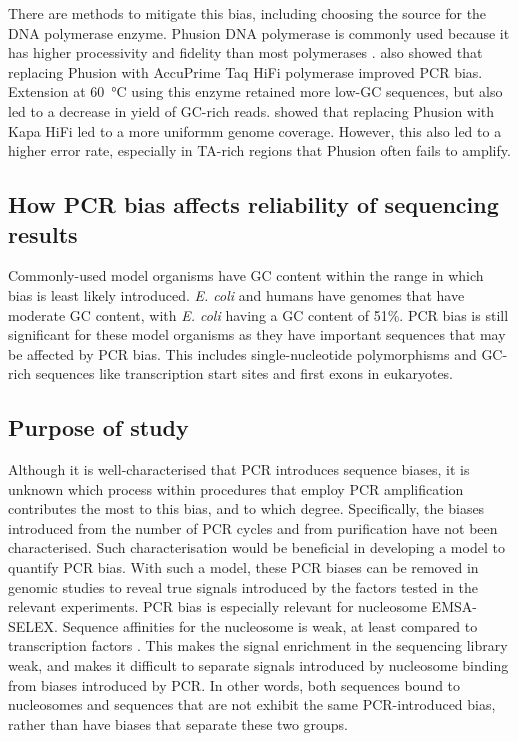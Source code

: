 \documentclass[parskip=full, numbers=noenddot]{scrbook}
\begin{document}
There are methods to mitigate this bias, including choosing the source for the DNA polymerase enzyme.  Phusion DNA polymerase is commonly used because it has higher processivity and fidelity than most polymerases \citep{quail_optimal_2012}.  \citet{aird_analyzing_2011} also showed that replacing Phusion with AccuPrime Taq HiFi polymerase improved PCR bias.  Extension at \SI{60}{\celsius} using this enzyme retained more low-GC sequences, but also led to a decrease in yield of GC-rich reads.  \citet{quail_optimal_2012} showed that replacing Phusion with Kapa HiFi led to a more uniformm genome coverage.  However, this also led to a higher error rate, especially in TA-rich regions that Phusion often fails to amplify.

\subsection{How PCR bias affects reliability of sequencing results}
\label{ssec:pcrbias_intro_effects}

Commonly-used model organisms have GC content within the range in which bias is least likely introduced.  \emph{E. coli} and humans have genomes that have moderate GC content, with \emph{E. coli} having a GC content of 51\%.  PCR bias is still significant for these model organisms as they have important sequences that may be affected by PCR bias.  This includes single-nucleotide polymorphisms and GC-rich sequences like transcription start sites and first exons in eukaryotes.  %

\subsection{Purpose of study}
\label{ssec:pcrbias_intro_why}

Although it is well-characterised that PCR introduces sequence biases, it is unknown which process within procedures that employ PCR amplification contributes the most to this bias, and to which degree.  Specifically, the biases introduced from the number of PCR cycles and from purification have not been characterised.  Such characterisation would be beneficial in developing a model to quantify PCR bias.  With such a model, these PCR biases can be removed in genomic studies to reveal true signals introduced by the factors tested in the relevant experiments.  PCR bias is especially relevant for nucleosome EMSA-SELEX.  Sequence affinities for the nucleosome is weak, at least compared to transcription factors \citep{struhl_determinants_2013}.  This makes the signal enrichment in the sequencing library weak, and makes it difficult to separate signals introduced by nucleosome binding from biases introduced by PCR.  In other words, both sequences bound to nucleosomes and sequences that are not exhibit the same PCR-introduced bias, rather than have biases that separate these two groups.
\end{document}
